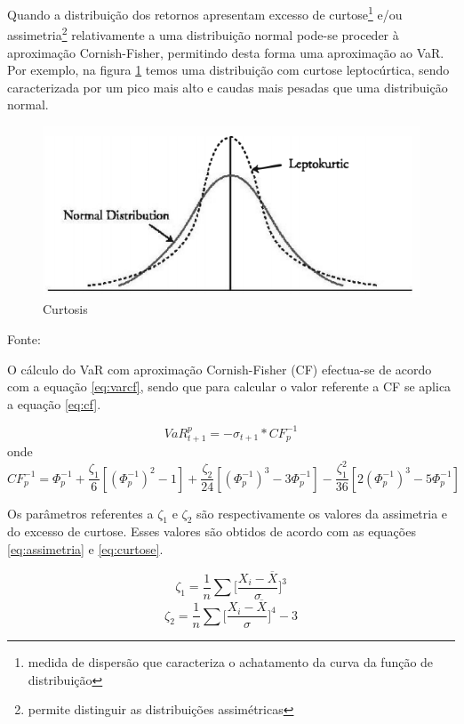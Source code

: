 \documentclass[
  12pt,
  a4paper,
  openany]{book}
\theoremstyle{definition}
\theoremstyle{definition}
\theoremstyle{definition}
\theoremstyle{remark}
\begin{document}
Quando a distribuição dos retornos apresentam excesso de curtose\footnote{medida de dispersão que caracteriza o achatamento da curva da função de distribuição} e/ou assimetria\footnote{permite distinguir as distribuições assimétricas} relativamente a uma distribuição normal pode-se proceder à aproximação Cornish-Fisher, permitindo desta forma uma aproximação ao VaR. Por exemplo, na figura \ref{fig:quant} temos uma distribuição com curtose leptocúrtica, sendo caracterizada por um pico mais alto e caudas mais pesadas que uma distribuição normal.
\bigskip

\begin{figure}

{\centering \includegraphics[width=0.6\linewidth]{image/kurtosis} 

}

\caption{Curtosis}\label{fig:quant}
\end{figure}
\centering

Fonte: \citep[pp.46]{quant}

\justifying

O cálculo do VaR com aproximação Cornish-Fisher (CF) efectua-se de acordo com a equação \eqref{eq:varcf}, sendo que para calcular o valor referente a CF se aplica a equação \eqref{eq:cf}.

\begin{equation} 
  VaR_{t+1}^{p} = -\sigma_{t+1}*CF_{p}^{-1}
  \label{eq:varcf}
\end{equation}
onde
\begin{equation} 
  CF_{p}^{-1} = \Phi_{p}^{-1} + \frac{\zeta_{1}}{6}[(\Phi_{p}^{-1})^2-1] + \frac{\zeta_{2}}{24}[(\Phi_{p}^{-1})^3-3\Phi_{p}^{-1}] - \frac{\zeta_{1}^{2}}{36}[2(\Phi_{p}^{-1})^3-5\Phi_{p}^{-1}]
  \label{eq:cf}
\end{equation}

Os parâmetros referentes a \(\zeta_1\) e \(\zeta_2\) são respectivamente os valores da assimetria e do excesso de curtose. Esses valores são obtidos de acordo com as equações \eqref{eq:assimetria} e \eqref{eq:curtose}.

\begin{equation} 
 \zeta_1 = \frac{1}{n}\sum\bigg[\frac{X_i - \overline{X}}{\sigma}\bigg]^3
  \label{eq:assimetria}
\end{equation}
\begin{equation} 
 \zeta_2 = \frac{1}{n}\sum\bigg[\frac{X_i - \overline{X}}{\sigma}\bigg]^4 - 3
  \label{eq:curtose}
\end{equation}
\end{document}
